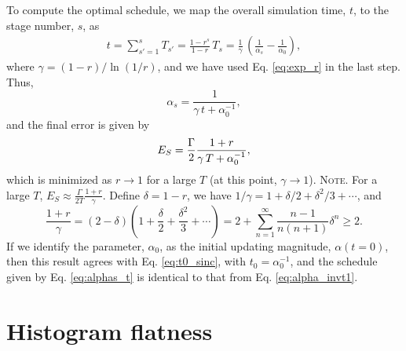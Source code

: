 \documentclass[reprint, superscriptaddress, floatfix]{revtex4-1}
\newcommand{\note}[1]{{\color{DarkGreen}\footnotesize \textsc{Note.} #1}}
\begin{document}
To compute the optimal schedule,
we map the overall simulation time, $t$,
to the stage number, $s$, as
%
\begin{align*}
  t
  = \sum_{s' = 1}^s T_{s'}
  = \frac{ 1 - r^s } { 1 - r } \, T_s
  = \frac{ 1 } { \gamma } \,
  \left(
    \frac{1}{\alpha_s}
    -
    \frac{1}{\alpha_0}
  \right)
  ,
\end{align*}
where
$\gamma = ( 1 - r ) / \ln(1/r)$,
and we have used Eq. \eqref{eq:exp_r} in the last step.
%
Thus,
%
\begin{equation}
  \alpha_s =
  \frac{ 1 }
  { \gamma \, t + \alpha_0^{-1} }
  ,
  \label{eq:alphas_t}
\end{equation}
%
and the final error is given by
%
\begin{align}
  E_S
  =
  \frac{\Gamma}{2}
  \frac{ 1 + r }
  { \gamma \, T + \alpha_0^{-1} }
  ,
  \notag
\end{align}
%
which is minimized as $r \to 1$
for a large $T$
(at this point, $\gamma \to 1$).
%
\note{
  For a large $T$, $E_S \approx \frac{\Gamma}{2T} \frac{1+r}{\gamma}$.
  Define $\delta = 1 - r$,
  we have $1/\gamma = 1+ \delta/2 + \delta^2/3 + \cdots$,
  and
  $$
  \frac{1+r}{\gamma}
  =
  (2 - \delta)
  \left(
  1 + \frac{\delta}{2} + \frac{\delta^2}{3} + \cdots
  \right)
  =
  2 + \sum_{n=1}^\infty \frac{n-1}{n(n+1)}\delta^n \ge 2
  .
  $$
}
%
If we identify the parameter, $\alpha_0$,
as the initial updating magnitude, $\alpha(t = 0)$,
then this result agrees with Eq. \eqref{eq:t0_sinc},
with $t_0 = \alpha_0^{-1}$,
and the schedule given by Eq. \eqref{eq:alphas_t}
is identical to that from Eq. \eqref{eq:alpha_invt1}.




\section{\label{sec:flatness}
Histogram flatness}
\end{document}
